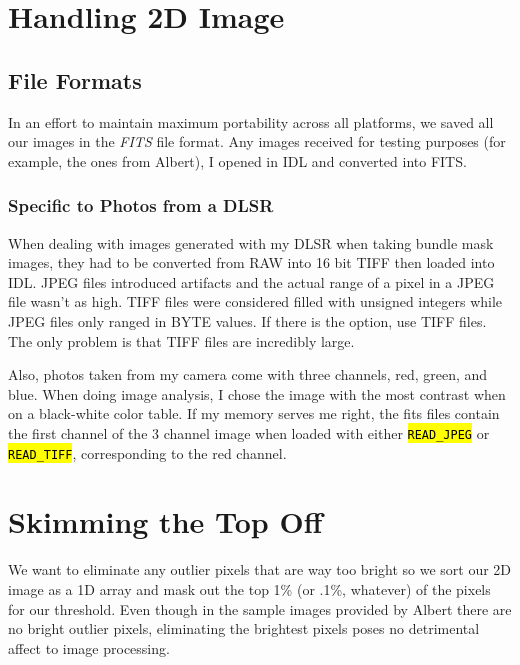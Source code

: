 \documentclass[10pt]{scrartcl}
\begin{document}

\section{Handling 2D Image} %
\label{sec:handling_2d_image}

\subsection{File Formats} %
\label{sub:file_formats}
In an effort to maintain maximum portability across all platforms, we saved all our images in the \emph{FITS} file format. Any images received for testing purposes (for example, the ones from Albert), I opened in IDL and converted into FITS. 

\subsubsection{Specific to Photos from a DLSR} %
 \label{ssub:specific_to_photos_from_a_dlsr}
When dealing with images generated with my DLSR when taking bundle mask images, they had to be converted from RAW into 16 bit TIFF then loaded into IDL. JPEG files introduced artifacts and the actual range of a pixel in a JPEG file wasn't as high. TIFF files were considered filled with unsigned integers while JPEG files only ranged in BYTE values. If there is the option, use TIFF files. The only problem is that TIFF files are incredibly large.  

Also, photos taken from my camera come with three channels, red, green, and blue. When doing image analysis, I chose the image with the most contrast when on a black-white color table. If my memory serves me right, the fits files contain the first channel of the 3 channel image when loaded with either \hl{\texttt{READ\_JPEG}} or \hl{\texttt{READ\_TIFF}}, corresponding to the red channel.



\section{Skimming the Top Off} %
\label{sec:skimming_the_top_off}
We want to eliminate any outlier pixels that are way too bright so we sort our 2D image as a 1D array and mask out the top 1\% (or .1\%, whatever) of the pixels for our threshold. Even though in the sample images provided by Albert there are no bright outlier pixels, eliminating the brightest pixels poses no detrimental affect to image processing.
\end{document}
